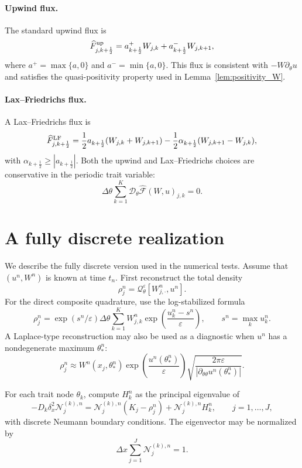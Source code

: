 \documentclass[11pt]{article}
\begin{document}
\paragraph{Upwind flux.}
The standard upwind flux is
\[
    \widehat F_{j,k+\frac12}^{\rm up}
    =
    a_{k+\frac12}^+W_{j,k}
    +
    a_{k+\frac12}^-W_{j,k+1},
\]
where \(a^+=\max\{a,0\}\) and \(a^- =\min\{a,0\}\). This flux is consistent
with \(-W\partial_\theta u\) and satisfies the quasi-positivity property used
in Lemma~\ref{lem:positivity_W}.

\paragraph{Lax--Friedrichs flux.}
A Lax--Friedrichs flux is
\[
    \widehat F_{j,k+\frac12}^{\rm LF}
    =
    \frac12a_{k+\frac12}(W_{j,k}+W_{j,k+1})
    -
    \frac12\alpha_{k+\frac12}(W_{j,k+1}-W_{j,k}),
\]
with \(\alpha_{k+\frac12}\ge |a_{k+\frac12}|\). Both the upwind and
Lax--Friedrichs choices are conservative in the periodic trait variable:
\[
    \Delta\theta\sum_{k=1}^K
    \mathcal D_\theta\widehat{\mathcal F}(W,u)_{j,k}=0 .
\]

\section{A fully discrete realization}
\label{append:full_discretization}

We describe the fully discrete version used in the numerical tests. Assume
that \((u^n,W^n)\) is known at time \(t_n\). First reconstruct the total
density
\[
    \rho_j^n
    =
    \mathcal Q_\theta^\varepsilon[W_{j,\cdot}^n,u^n] .
\]
For the direct composite quadrature, use the log-stabilized formula
\[
    \rho_j^n
    =
    \exp(s^n/\varepsilon)
    \Delta\theta\sum_{k=1}^K
    W_{j,k}^n
    \exp\left(\frac{u_k^n-s^n}{\varepsilon}\right),
    \qquad
    s^n=\max_k u_k^n .
\]
A Laplace-type reconstruction may also be used as a diagnostic when
\(u^n\) has a nondegenerate maximum \(\theta_*^n\):
\[
    \rho_j^n
    \approx
    W^n(x_j,\theta_*^n)
    \exp\left(\frac{u^n(\theta_*^n)}{\varepsilon}\right)
    \sqrt{
    \frac{2\pi\varepsilon}
    {|\partial_{\theta\theta}u^n(\theta_*^n)|}
    } .
\]

For each trait node \(\theta_k\), compute \(H_k^n\) as the principal
eigenvalue of
\[
    -D_k\delta_x^2\mathcal N_j^{(k),n}
    =
    \mathcal N_j^{(k),n}(K_j-\rho_j^n)
    +
    \mathcal N_j^{(k),n}H_k^n,
    \qquad j=1,\ldots,J,
\]
with discrete Neumann boundary conditions. The eigenvector may be normalized by
\[
    \Delta x\sum_{j=1}^J\mathcal N_j^{(k),n}=1 .
\]
\end{document}
